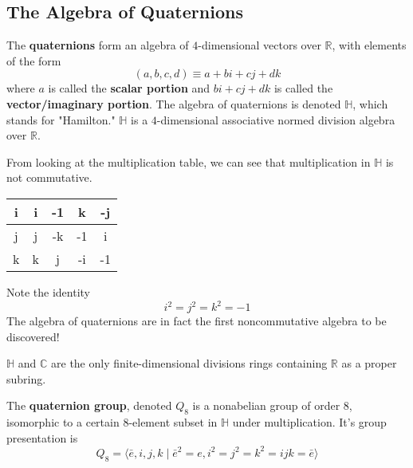 \subsection{The Algebra of Quaternions}

  \begin{definition}
    The \textbf{quaternions} form an algebra of $4$-dimensional vectors over $\mathbb{R}$, with elements of the form
    \begin{equation}
      (a, b, c, d) \equiv a + bi + cj + dk
    \end{equation}
    where $a$ is called the \textbf{scalar portion} and $bi + cj + dk$ is called the \textbf{vector/imaginary portion}. The algebra of quaternions is denoted $\mathbb{H}$, which stands for "Hamilton." $\mathbb{H}$ is a $4$-dimensional associative normed division algebra over $\mathbb{R}$. 
  \end{definition}

  From looking at the multiplication table, we can see that multiplication in $\mathbb{H}$ is not commutative. 
  \begin{center}
    \begin{tabular}{|c|c|c|c|c|}
    \hline
    i & i & -1 & k & -j \\ 
    \hline
    j & j & -k & -1 & i \\ 
    \hline
    k & k & j & -i & -1 \\ 
    \hline
    \end{tabular}
  \end{center}
  Note the identity 
  \begin{equation}
    i^2 = j^2 = k^2 = -1
  \end{equation}
  The algebra of quaternions are in fact the first noncommutative algebra to be discovered! 

  \begin{proposition}
    $\mathbb{H}$ and $\mathbb{C}$ are the only finite-dimensional divisions rings containing $\mathbb{R}$ as a proper subring. 
  \end{proposition}

  \begin{definition}
    The \textbf{quaternion group}, denoted $Q_8$ is a nonabelian group of order $8$, isomorphic to a certain $8$-element subset in $\mathbb{H}$ under multiplication. It's group presentation is 
    \begin{equation}
      Q_8 = \big\langle \bar{e}, i, j, k \;|\; \bar{e}^2 = e, i^2 = j^2 = k^2 = ijk = \bar{e} \big\rangle
    \end{equation}
  \end{definition}

